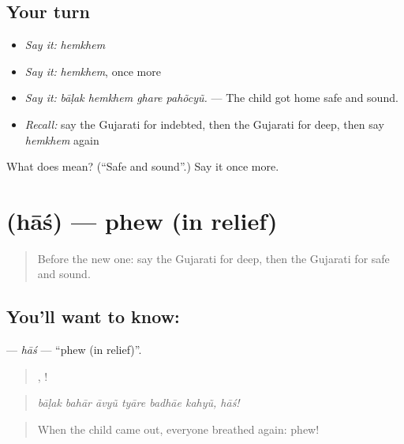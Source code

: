 \subsection*{Your turn}
\begin{itemize}
\raggedright
  \item \emph{Say it:} \emph{hemkhem}
  \item \emph{Say it:} \emph{hemkhem}, once more
  \item \emph{Say it:} \emph{bāḷak hemkhem ghare pahõcyũ.} — The child got home safe and sound.
  \item \emph{Recall:} say the Gujarati for indebted, then the Gujarati for deep, then say \emph{hemkhem} again
\end{itemize}

\begin{tcolorbox}[breakable,colback=teal!4,colframe=teal!35!black,title={Before you move on}]
What does  mean? (\textquotedblleft{}Safe and sound\textquotedblright{}.) Say it once more.
\end{tcolorbox}
\section[\texorpdfstring{\gu{હાશ} (hāś)}{હાશ (hāś)}]{ (hāś) — phew (in relief)}

\label{lesson:GU-C307-has}



\begin{quote}
Before the new one: say the Gujarati for deep, then the Gujarati for safe and sound.
\end{quote}

\subsection*{You'll want to know: }
\textbf{} — \emph{hāś} — \textquotedblleft{}phew (in relief)\textquotedblright{}.

\begin{quote}
     , !
\end{quote}

\begin{quote}
\emph{bāḷak bahār āvyũ tyāre badhāe kahyũ, hāś!}
\end{quote}

\begin{quote}
When the child came out, everyone breathed again: phew!
\end{quote}

